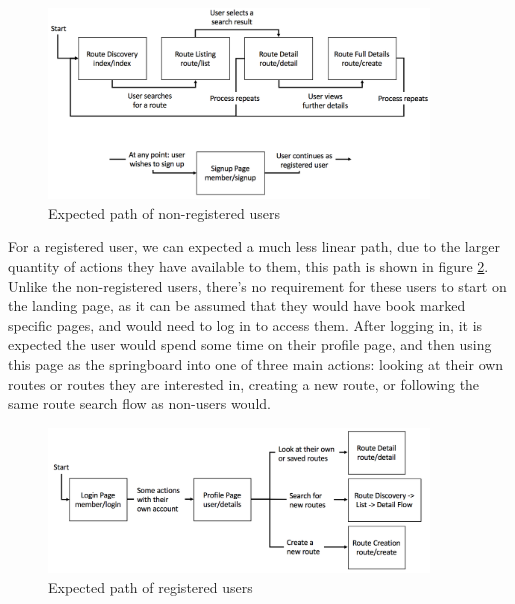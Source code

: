 \begin{figure}[!ht]
	\begin{center}
		\includegraphics[width=0.9\textwidth]{images/design/nonuser_flow.png}
	\end{center}
	\vspace{-6mm}
	\caption{Expected path of non-registered users}
	\label{fig:nonuser_flow}
\end{figure}

\noindent 
For a registered user, we can expected a much less linear path, due to the larger quantity of actions they have available to them, this path is shown in figure \ref{fig:user_flow}. Unlike the non-registered users, there's no requirement for these users to start on the landing page, as it can be assumed that they would have book marked specific pages, and would need to log in to access them. After logging in, it is expected the user would spend some time on their profile page, and then using this page as the springboard into one of three main actions: looking at their own routes or routes they are interested in, creating a new route, or following the same route search flow as non-users would.

\begin{figure}[!ht]
	\vspace{-5mm}
	\begin{center}
		\includegraphics[width=0.9\textwidth]{images/design/user_flow.png}
	\end{center}
	\vspace{-6mm}
	\caption{Expected path of registered users}
	\label{fig:user_flow}
\end{figure}

